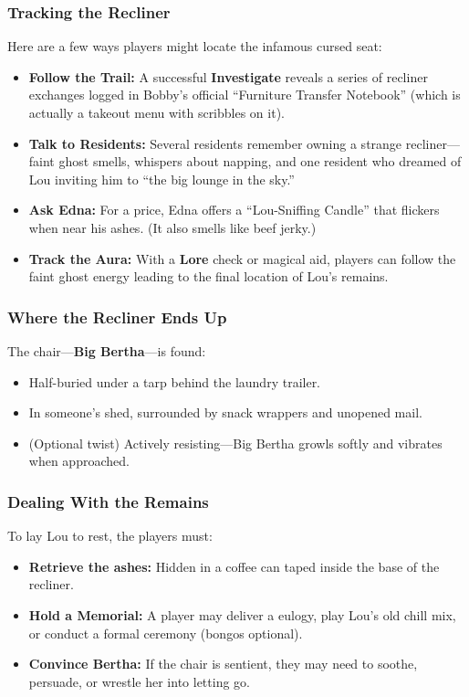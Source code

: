 \begin{multicols}{2}
\subsubsection*{Tracking the Recliner}
Here are a few ways players might locate the infamous cursed seat:
\begin{itemize}
    \item \textbf{Follow the Trail:} A successful \textbf{Investigate}  reveals a series of recliner exchanges logged in Bobby’s official “Furniture Transfer Notebook” (which is actually a takeout menu with scribbles on it).
    \item \textbf{Talk to Residents:} Several residents remember owning a strange recliner—faint ghost smells, whispers about napping, and one resident who dreamed of Lou inviting him to “the big lounge in the sky.”
    \item \textbf{Ask Edna:} For a price, Edna offers a “Lou-Sniffing Candle” that flickers when near his ashes. (It also smells like beef jerky.)
    \item \textbf{Track the Aura:} With a \textbf{Lore}  check or magical aid, players can follow the faint ghost energy leading to the final location of Lou’s remains.
\end{itemize}

\subsubsection*{Where the Recliner Ends Up}
The chair—\textbf{Big Bertha}—is found:
\begin{itemize}
    \item Half-buried under a tarp behind the laundry trailer.
    \item In someone’s shed, surrounded by snack wrappers and unopened mail.
    \item (Optional twist) Actively resisting—Big Bertha growls softly and vibrates when approached.
\end{itemize}

\subsubsection*{Dealing With the Remains}
To lay Lou to rest, the players must:
\begin{itemize}
    \item \textbf{Retrieve the ashes:} Hidden in a coffee can taped inside the base of the recliner.
    \item \textbf{Hold a Memorial:} A player may deliver a eulogy, play Lou’s old chill mix, or conduct a formal ceremony (bongos optional).
    \item \textbf{Convince Bertha:} If the chair is sentient, they may need to soothe, persuade, or wrestle her into letting go.
\end{itemize}


\end{multicols}
